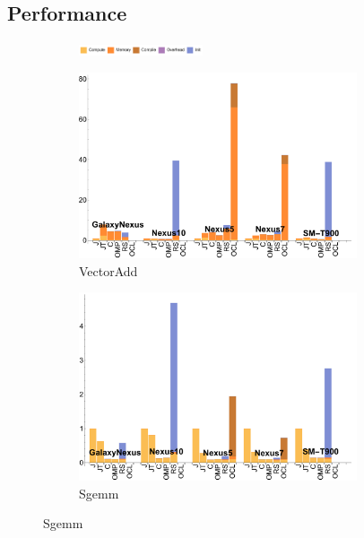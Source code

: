 \subsection{Performance}

\begin{figure}[t]

  \begin{subfigure}[b]{\textwidth}
          \centering
          \includegraphics[width=0.4\textwidth]{data/legend.pdf}
  \end{subfigure}

  \begin{subfigure}[b]{0.5\textwidth}
      \centering
      \includegraphics[width=0.9\textwidth]{data/VectorAdd_onecompute_time.pdf}
      \caption{VectorAdd}\label{fig:vectoradd}
  \end{subfigure}
  \begin{subfigure}[b]{0.5\textwidth}
      \centering
      \includegraphics[width=0.9\textwidth]{data/Sgemm_onecompute_time.pdf}
      \caption{Sgemm}\label{fig:Sgemm}
  \end{subfigure}


\end{figure}
